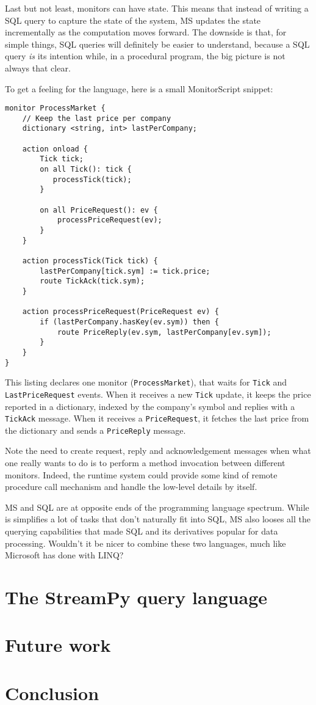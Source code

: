 \documentclass{report}
\begin{document}
Last but not least, monitors can have state. This means that instead
of writing a SQL query to capture the state of the system, MS updates
the state incrementally as the computation moves forward. The downside
is that, for simple things, SQL queries will definitely be easier to
understand, because a SQL query \emph{is} its intention while, in a
procedural program, the big picture is not always that clear.

To get a feeling for the language, here is a small MonitorScript
snippet:

\begin{verbatim}
monitor ProcessMarket {
    // Keep the last price per company
    dictionary <string, int> lastPerCompany;

    action onload {
        Tick tick;
        on all Tick(): tick {
           processTick(tick);
        }

        on all PriceRequest(): ev {
            processPriceRequest(ev);
        }
    }

    action processTick(Tick tick) {
        lastPerCompany[tick.sym] := tick.price;
        route TickAck(tick.sym);
    }

    action processPriceRequest(PriceRequest ev) {
        if (lastPerCompany.hasKey(ev.sym)) then {
            route PriceReply(ev.sym, lastPerCompany[ev.sym]);
        }
    }
}
\end{verbatim}

This listing declares one monitor (\verb=ProcessMarket=), that waits
for \verb=Tick= and \verb=LastPriceRequest= events. When it receives a
new \verb=Tick= update, it keeps the price reported in a dictionary,
indexed by the company's symbol and replies with a \verb=TickAck=
message. When it receives a \verb=PriceRequest=, it fetches the last
price from the dictionary and sends a \verb=PriceReply= message.

Note the need to create request, reply and acknowledgement messages
when what one really wants to do is to perform a method invocation
between different monitors. Indeed, the runtime system could provide
some kind of remote procedure call mechanism and handle the low-level
details by itself.

MS and SQL are at opposite ends of the programming language
spectrum. While is simplifies a lot of tasks that don't naturally fit
into SQL, MS also looses all the querying capabilities that made SQL
and its derivatives popular for data processing. Wouldn't it be nicer
to combine these two languages, much like Microsoft has done with
LINQ?

\chapter{The StreamPy query language}\label{streampy}

\chapter{Future work}\label{future-work}

\chapter{Conclusion}\label{conclusion}
\end{document}
